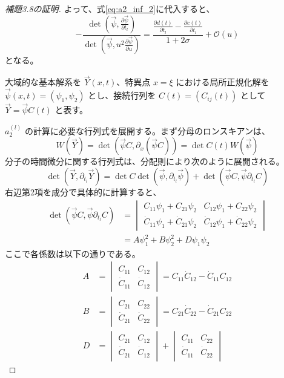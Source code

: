 \documentclass[paper=a4, fontsize=11pt]{jlreq} %
\newenvironment{story}{%
  \begin{mdframed}[
    backgroundcolor=red!5, %
    linewidth=0pt,         %
    innertopmargin=10pt,   %
    innerbottommargin=10pt,
    innerrightmargin=10pt, %
    innerleftmargin=10pt
  ]%
}{%
  \end{mdframed}%
}
\theoremstyle{break}
\theoremstyle{qa}
\begin{document}
\begin{story}
\begin{proof}[補題3.8の証明]
よって、式\eqref{eq:a2_inf_2}に代入すると、
\begin{equation}
     - \frac{\det\left(\vec{\psi}, \frac{\partial \vec{\psi}}{\partial t_l}\right)}{\det\left(\vec{\psi}, u^2 \frac{\partial \vec{\psi}}{\partial u}\right)}= \frac{\frac{\partial d(t)}{\partial t_l} - \frac{\partial c(t)}{\partial t_l}}{1+2\sigma} + \mathcal{O}(u)
\end{equation}
となる。

大域的な基本解系を $\vec{Y}(x,t)$、特異点 $x=\xi$ における局所正規化解を $\vec{\psi}(x,t) = (\psi_1, \psi_2)$ とし、接続行列を $C(t) = (C_{ij}(t))$ として $\vec{Y} = \vec{\psi}C(t)$ と表す。

$a_2^{(l)}$ の計算に必要な行列式を展開する。まず分母のロンスキアンは、
\begin{equation}
    W(\vec{Y}) = \det(\vec{\psi}C, \partial_x(\vec{\psi}C)) = \det C(t) W(\vec{\psi})
\end{equation}
分子の時間微分に関する行列式は、分配則により次のように展開される。
\begin{equation}
    \det(\vec{Y}, \partial_{t_l}\vec{Y}) = \det C \det(\vec{\psi}, \partial_{t_l}\vec{\psi}) + \det(\vec{\psi}C, \vec{\psi}\partial_{t_l}C)
\end{equation}
右辺第2項を成分で具体的に計算すると、
\begin{align*}
    \det(\vec{\psi}C, \vec{\psi}\partial_{t_l}C) 
    &= \begin{vmatrix} 
        C_{11}\psi_1 + C_{21}\psi_2 & C_{12}\psi_1 + C_{22}\psi_2 \\ 
        \dot{C}_{11}\psi_1 + \dot{C}_{21}\psi_2 & \dot{C}_{12}\psi_1 + \dot{C}_{22}\psi_2 
    \end{vmatrix} \\
    &= A\psi_1^2 + B\psi_2^2 + D\psi_1\psi_2
\end{align*}
ここで各係数は以下の通りである。
\begin{align*}
    A &= \begin{vmatrix} C_{11} & C_{12} \\ \dot{C}_{11} & \dot{C}_{12} \end{vmatrix} = C_{11}\dot{C}_{12} - \dot{C}_{11}C_{12} \\
    B &= \begin{vmatrix} C_{21} & C_{22} \\ \dot{C}_{21} & \dot{C}_{22} \end{vmatrix} = C_{21}\dot{C}_{22} - \dot{C}_{21}C_{22} \\
    D &= \begin{vmatrix} C_{21} & C_{12} \\ \dot{C}_{21} & \dot{C}_{12} \end{vmatrix} + \begin{vmatrix} C_{11} & C_{22} \\ \dot{C}_{11} & \dot{C}_{22} \end{vmatrix}
\end{align*}


\end{proof}
\end{story}
\end{document}
